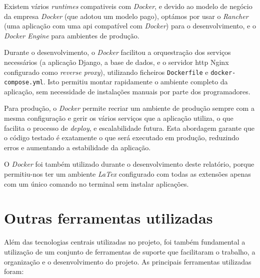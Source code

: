 Existem vários \textit{runtimes} compativeis com \textit{Docker}, e devido ao modelo de negócio da empresa \textit{Docker} (que adotou um modelo pago), optámos por usar o \textit{Rancher} (uma aplicação com uma \gls{api} compatível com \textit{Docker}) para o desenvolvimento, e o \textit{Docker Engine} para ambientes de produção.

Durante o desenvolvimento, o \textit{Docker} facilitou a orquestração dos serviços necessários (a aplicação Django, a base de dados, e o servidor \gls{http} Nginx configurado como \textit{reverse proxy}), utilizando ficheiros \texttt{Dockerfile} e \texttt{docker-compose.yml}. Isto permitiu montar rapidamente o ambiente completo da aplicação, sem necessidade de instalações manuais por parte dos programadores.

Para produção, o \textit{Docker} permite recriar um ambiente de produção sempre com a mesma configuração e gerir os vários serviços que a aplicação utiliza, o que facilita o processo de \textit{deploy}, e escalabilidade futura. Esta abordagem garante que o código testado é exatamente o que será executado em produção, reduzindo erros e aumentando a estabilidade da aplicação.

O \textit{Docker} foi também utilizado durante o desenvolvimento deste relatório, porque permitiu-nos ter um ambiente \textit{LaTex} configurado com todas as extensões apenas com um único comando no terminal sem instalar aplicações.

\section{Outras ferramentas utilizadas}
\label{sec:tools}

Além das tecnologias centrais utilizadas no projeto, foi também fundamental a utilização de um conjunto de ferramentas de suporte que facilitaram o trabalho, a organização e o desenvolvimento do projeto. As principais ferramentas utilizadas foram:

